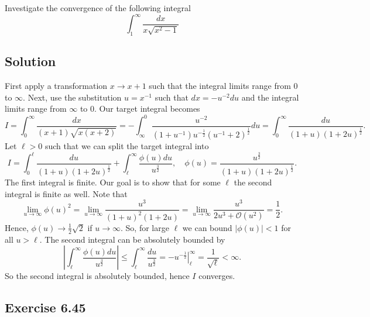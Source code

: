 Investigate the convergence of the following integral
\begin{equation*}
    \int_1^{\infty} \frac{dx}{x \sqrt{x^2 - 1}}
\end{equation*}

\subsection*{Solution}

First apply a transformation $x \to x + 1$ such that the integral limits range from $0$ to $\infty$.
Next, use the substitution $u = x^{-1}$ such that $dx = -u^{-2} du$ and the integral limits range from $\infty$ to $0$.
Our target integral becomes
\begin{equation*}
    I = \int_0^{\infty} \frac{dx}{(x + 1)\sqrt{x(x + 2)}}
        = - \int_{\infty}^{0} \frac{u^{-2}}{(1 + u^{-1})u^{-\frac{1}{2}} (u^{-1} + 2)^{\frac{1}{2}}} du
        = \int_0^{\infty} \frac{du}{(1 + u)(1 + 2u)^{\frac{1}{2}}}.
\end{equation*}
Let $\ell > 0$ such that we can split the target integral into
\begin{equation*}
    I = \int_0^{\ell} \frac{du}{(1 + u)(1 + 2u)^{\frac{1}{2}}} + \int_{\ell}^{\infty} \frac{\phi(u) du}{u^{\frac{3}{2}}},
        \quad \phi(u) = \frac{u^{\frac{3}{2}}}{(1 + u)(1 + 2u)^{\frac{1}{2}}}.
\end{equation*}
The first integral is finite.
Our goal is to show that for some $\ell$ the second integral is finite as well.
Note that
\begin{equation*}
    \lim_{u \to \infty} \phi(u)^2 = \lim_{u \to \infty} \frac{u^3}{(1 + u)^2(1 + 2u)}
        = \lim_{u \to \infty} \frac{u^3}{2u^3 + \mathcal{O}(u^2)}
        = \frac{1}{2}.
\end{equation*}
Hence, $\phi(u) \to \frac{1}{2}\sqrt{2}$ if $u \to \infty$.
So, for large $\ell$ we can bound $|\phi(u)| < 1$ for all $u > \ell$.
The second integral can be absolutely bounded by
\begin{equation*}
    \left| \int_{\ell}^{\infty} \frac{\phi(u) du}{u^{\frac{3}{2}}} \right|
        \leq \int_{\ell}^{\infty} \frac{du}{u^{\frac{3}{2}}}
        = \left. -u^{-\frac{1}{2}} \right|_{\ell}^{\infty}
        = \frac{1}{\sqrt{\ell}} < \infty.
\end{equation*}
So the second integral is absolutely bounded, hence $I$ converges.


\subsection*{Exercise 6.45}

